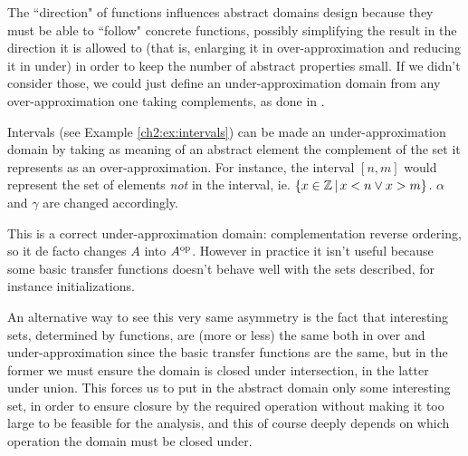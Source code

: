 The ``direction" of functions influences abstract domains design because they must be able to ``follow" concrete functions, possibly simplifying the result in the direction it is allowed to (that is, enlarging it in over-approximation and reducing it in under) in order to keep the number of abstract properties small.
If we didn't consider those, we could just define an under-approximation domain from any over-approximation one taking complements, as done in \cite{lev-backward-analysis-complement}.
\begin{example}
	Intervals (see Example \ref{ch2:ex:intervals}) can be made an under-approximation domain by taking as meaning of an abstract element the complement of the set it represents as an over-approximation.
	For instance, the interval $[n, m]$ would represent the set of elements \textit{not} in the interval, ie. $\{ x \in \mathbb{Z} \,\vert\, x < n \lor x > m \}$.
	$\alpha$ and $\gamma$ are changed accordingly.

	This is a correct under-approximation domain: complementation reverse ordering, so it de facto changes $A$ into $A^{\text{op}}$. However in practice it isn't useful because some basic transfer functions doesn't behave well with the sets described, for instance initializations.
\end{example}

An alternative way to see this very same asymmetry is the fact that interesting sets, determined by functions, are (more or less) the same both in over and under-approximation since the basic transfer functions are the same, but in the former we must ensure the domain is closed under intersection, in the latter under union. This forces us to put in the abstract domain only some interesting set, in order to ensure closure by the required operation without making it too large to be feasible for the analysis, and this of course deeply depends on which operation the domain must be closed under.

